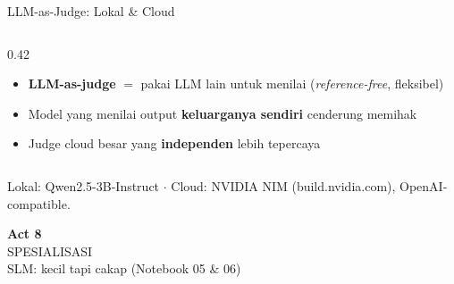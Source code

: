 \documentclass[aspectratio=169,t]{beamer}
\newcommand{\acttitle}[3]{%
  \begin{frame}[plain]
    \vspace{1.5cm}
    \begin{center}
      {\color{nvgreen}\Huge\bfseries Act #1}\\[1.2em]
      {\color{nvwhite}\Huge #2}\\[0.8em]
      {\color{nvgray}\Large #3}
    \end{center}
  \end{frame}%
}
\begin{document}
\begin{frame}{LLM-as-Judge: Lokal \& Cloud}
\begin{columns}[T]
\begin{column}{0.42\textwidth}
\begin{itemize}
        \footnotesize
        \item \textbf{LLM-as-judge} $=$ pakai LLM lain untuk menilai (\emph{reference-free}, fleksibel)
        \item Model yang menilai output \textbf{keluarganya sendiri} cenderung memihak
        \item Judge cloud besar yang \textbf{independen} lebih tepercaya
      \end{itemize}
    \end{column}
  \end{columns}
  \vspace{0.2em}
  \begin{center}
    \textcolor{nvlightgreen}{\small Lokal: Qwen2.5-3B-Instruct $\cdot$ Cloud: NVIDIA NIM (build.nvidia.com), OpenAI-compatible.}
  \end{center}
\end{frame}

\acttitle{8}{SPESIALISASI}{SLM: kecil tapi cakap (Notebook 05 \& 06)}
\end{document}
